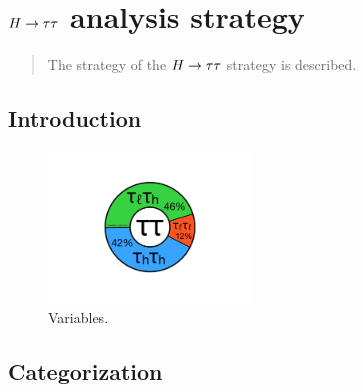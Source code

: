 \chapter[strategy][strategy]{$H\rightarrow\tau\tau$ analysis strategy}
\label{chap:strategy}

\begin{quote}
The strategy of the $H\rightarrow\tau\tau$ strategy is described.
\end{quote}

\section{Introduction}
\label{sec:strategy-introduction}

\begin{figure}[tp]
  \centering
  \includegraphics[width=0.48\textwidth]{figures/piecharts/tautaudecay}
  \caption{Variables.}
  \label{fig:strategy-decaypie}
\end{figure}

\section{Categorization}
\label{sec:strategy-categorization}

